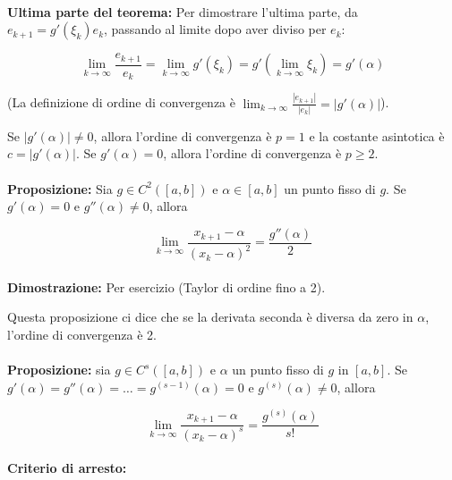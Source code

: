 \documentclass[a4paper, 11pt]{article}
\begin{document}
        \paragraph{}
        \textbf{Ultima parte del teorema:}
        Per dimostrare l'ultima parte, da $e_{k+1} = g'(\xi_k) e_k$, passando al limite dopo aver diviso per $e_k$:

        $$
            \lim_{k \to \infty} \frac{e_{k+1}}{e_k} = \lim_{k \to \infty} g'(\xi_k) = g'(\lim_{k \to \infty} \xi_k) = g'(\alpha)
        $$

        (La definizione di ordine di convergenza è $\lim_{k \to \infty} \frac{|e_{k+1}|}{|e_k|} = |g'(\alpha)|$).

        Se $|g'(\alpha)| \neq 0$, allora l'ordine di convergenza è $p = 1$ e la costante asintotica è $c = |g'(\alpha)|$.
        Se $g'(\alpha) = 0$, allora l'ordine di convergenza è $p \ge 2$.


        \paragraph{}
        \textbf{Proposizione:} Sia $g \in C^2([a,b])$ e $\alpha \in [a,b]$ un punto fisso di $g$. Se $g'(\alpha) = 0$ e $g''(\alpha) \neq 0$, allora

        $$
            \lim_{k \to \infty} \frac{x_{k+1} - \alpha}{(x_k - \alpha)^2} = \frac{g''(\alpha)}{2}
        $$

        \paragraph{}
        \textbf{Dimostrazione:}
        Per esercizio (Taylor di ordine fino a 2).

        Questa proposizione ci dice che se la derivata seconda è diversa da zero in $\alpha$, l'ordine di convergenza è 2.

        \paragraph{}
        \textbf{Proposizione:} sia $g \in C^s([a,b])$ e $\alpha$ un punto fisso di $g$ in $[a,b]$. Se $g'(\alpha) = g''(\alpha) = \ldots = g^{(s-1)}(\alpha) = 0$ e $g^{(s)}(\alpha) \neq 0$, allora

        $$
            \lim_{k \to \infty} \frac{x_{k+1} - \alpha}{(x_k - \alpha)^s} = \frac{g^{(s)}(\alpha)}{s!}
        $$

        \paragraph{}
        \textbf{Criterio di arresto: }
\end{document}
